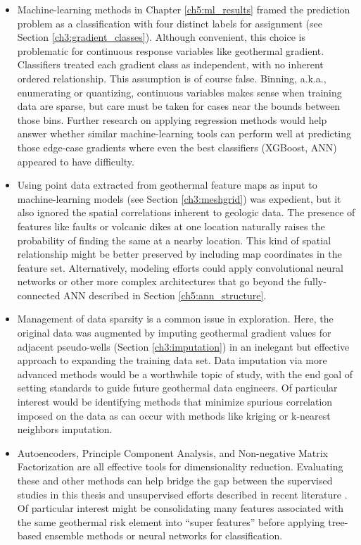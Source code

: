 \begin{itemize}
    \item Machine-learning methods in Chapter \ref{ch5:ml_results} framed the prediction problem as a classification with four distinct labels for assignment (see Section \ref{ch3:gradient_classes}). Although convenient, this choice is problematic for continuous response variables like geothermal gradient. Classifiers treated each gradient class as independent, with no inherent ordered relationship. This assumption is of course false. Binning, a.k.a., enumerating or quantizing, continuous variables makes sense when training data are sparse, but care must be taken for cases near the bounds between those bins. Further research on applying regression methods would help answer whether similar machine-learning tools can perform well at predicting those edge-case gradients where even the best classifiers (XGBoost, ANN) appeared to have difficulty.
    
    \item Using point data extracted from geothermal feature maps as input to machine-learning models (see Section \ref{ch3:meshgrid}) was expedient, but it also ignored the spatial correlations inherent to geologic data. The presence of features like faults or volcanic dikes at one location naturally raises the probability of finding the same at a nearby location. This kind of spatial relationship might be better preserved by including map coordinates in the feature set. Alternatively, modeling efforts could apply convolutional neural networks or other more complex architectures that go beyond the fully-connected ANN described in Section \ref{ch5:ann_structure}.
    
    \item Management of data sparsity is a common issue in exploration. Here, the original data was augmented by imputing geothermal gradient values for adjacent pseudo-wells (Section \ref{ch3:imputation}) in an inelegant but effective approach to expanding the training data set. Data imputation via more advanced methods would be a worthwhile topic of study, with the end goal of setting standards to guide future geothermal data engineers. Of particular interest would be identifying methods that minimize spurious correlation imposed on the data as can occur with methods like kriging or k-nearest neighbors imputation.
    
    \item Autoencoders, Principle Component Analysis, and Non-negative Matrix Factorization are all effective tools for dimensionality reduction. Evaluating these and other methods can help bridge the gap between the supervised studies in this thesis and unsupervised efforts described in recent literature \citep{pepin_new_2019,smith_characterizing_2021,vesselinov_discovering_2020}. Of particular interest might be consolidating many features associated with the same geothermal risk element into “super features” before applying tree-based ensemble methods or neural networks for classification.
    

\end{itemize}
